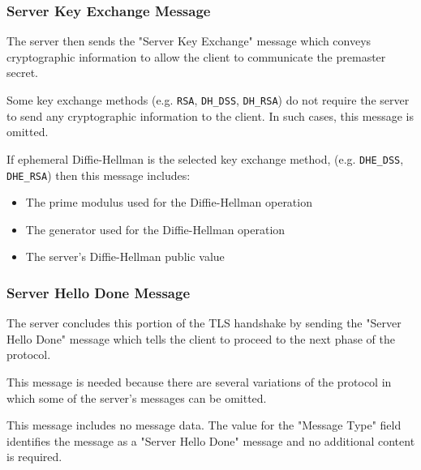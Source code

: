 \documentclass[aspectratio=169]{beamer}
\begin{document}
\begin{frame}[triangle=siiblue]
	\frametitle{Server Key Exchange Message}	
	The server then sends the "Server Key Exchange" message which conveys cryptographic information to allow the client to communicate the premaster secret.
	
	\vfill
	
		Some key exchange methods (e.g. \texttt{RSA},  \texttt{DH\_DSS}, \texttt{DH\_RSA}) do not require the server to send any cryptographic information to the client.  In such cases, this message is omitted.

	\vfill
	
	If ephemeral Diffie-Hellman is the selected key exchange method, (e.g. \texttt{DHE\_DSS}, \texttt{DHE\_RSA})  then this message includes:
	\begin{itemize}
		\item The prime modulus used for the Diffie-Hellman operation
		\item The generator used for the Diffie-Hellman operation
		\item The server's Diffie-Hellman public value
	\end{itemize}
	
\end{frame}

\begin{frame}[triangle=siiblue]
	\frametitle{Server Hello Done Message}
	The server concludes this portion of the TLS handshake by sending the "Server Hello Done" message which tells the client to proceed to the next phase of the protocol.
	
	\vfill
	
	This message is needed because there are several variations of the protocol in which some of the server's messages can be omitted.
	
	\vfill
	
	This message includes no message data. The value for the "Message Type" field identifies the message as a "Server Hello Done" message and no additional content is required.
\end{frame}
\end{document}
